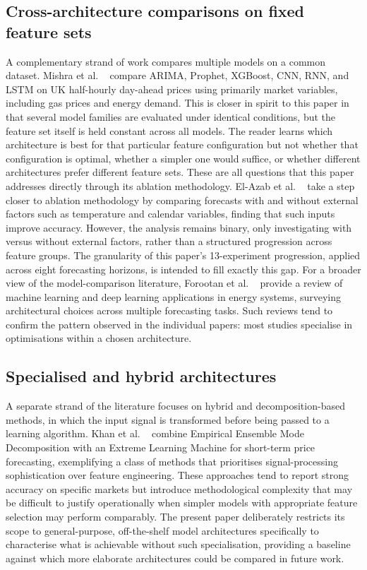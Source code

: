 \subsection{Cross-architecture comparisons on fixed feature sets}
A complementary strand of work compares multiple models
on a common dataset. Mishra et al. ~\cite{energyPricePredictionUK} compare 
ARIMA, Prophet, XGBoost, CNN, RNN, and LSTM on UK half-hourly
day-ahead prices using primarily market variables, including
gas prices and energy demand. This is closer in spirit to
this paper in that several model families are evaluated under
identical conditions, but the feature set itself is held constant
across all models. The reader learns which architecture is best
for that particular feature configuration but not whether that
configuration is optimal, whether a simpler one would suffice,
or whether different architectures prefer different feature sets.
These are all questions that this paper addresses directly through
its ablation methodology. El-Azab et al. ~\cite{consumptionPatterns} take a 
step closer to ablation methodology by comparing forecasts with and without
external factors such as temperature and calendar variables,
finding that such inputs improve accuracy. However, the
analysis remains binary, only investigating with versus without
external factors, rather than a structured progression across
feature groups. The granularity of this paper's 13-experiment
progression, applied across eight forecasting horizons, is
intended to fill exactly this gap. For a broader view of the
model-comparison literature, Forootan et al. ~\cite{energySystemsReview} 
provide a review of machine learning and deep learning applications in
energy systems, surveying architectural choices across multiple
forecasting tasks. Such reviews tend to confirm the pattern
observed in the individual papers: most studies specialise in
optimisations within a chosen architecture.

\subsection{Specialised and hybrid architectures}
A separate strand of the literature focuses on hybrid and
decomposition-based methods, in which the input signal is
transformed before being passed to a learning algorithm. Khan
et al. ~\cite{eemdElmPricePrediction} combine Empirical Ensemble Mode 
Decomposition with an Extreme Learning Machine for short-term price
forecasting, exemplifying a class of methods that prioritises
signal-processing sophistication over feature engineering. These
approaches tend to report strong accuracy on specific markets
but introduce methodological complexity that may be difficult
to justify operationally when simpler models with appropriate
feature selection may perform comparably. The present paper
deliberately restricts its scope to general-purpose, off-the-shelf model 
architectures specifically to characterise what is
achievable without such specialisation, providing a baseline
against which more elaborate architectures could be compared
in future work.

